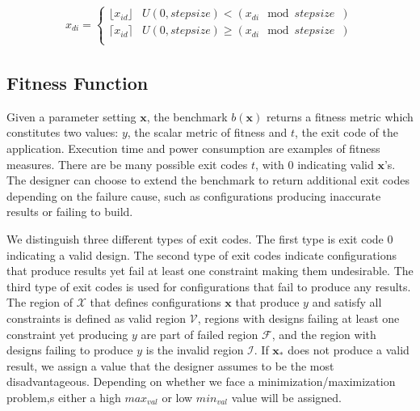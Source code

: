 \documentclass[runningheads,a4paper]{llncs}
\begin{document}


\begin{align} 
\label{eq:dithering}
x_{di} = 
\begin{cases}
\lfloor x_{id} \rfloor &  U(0,step size) < (x_{di}\mod{stepsize}\enspace)\\
\lceil x_{id} \rceil & U(0,step size) \ge (x_{di}\mod{stepsize}\enspace)\\
\end{cases}
\end{align}


 \subsection{Fitness Function}
\label{fitfunction}


Given a parameter setting $\mathbf{x}$, the benchmark $b(\mathbf{x})$ returns a fitness metric which constitutes two values: $y$, the scalar metric of fitness and $t$, the exit code of the application. Execution time and power consumption are examples of fitness measures. There are be many possible exit codes $t$, with 0 indicating valid $\mathbf{x}$'s. The designer can choose to extend the benchmark to return additional exit codes depending on the failure cause, such as configurations producing inaccurate results or failing to build. 

We distinguish three different types of exit codes. The first type is exit code 0 indicating a valid design. The second type of exit codes indicate configurations that produce results yet fail at least one constraint making them undesirable. The third type of exit codes is used for configurations that fail to produce any results. The region of $\mathcal{X}$ that defines configurations $\mathbf{x}$ that produce $y$ and satisfy all constraints is defined as valid region $\mathcal{V}$, regions with designs failing at least one constraint yet producing $y$ are part of failed region $\mathcal{F}$, and the region with designs failing to produce $y$ is the invalid region $\mathcal{I}$. If $\mathbf{x_*}$ does not produce a valid result, we assign a value that the designer assumes to be the most disadvantageous. Depending on whether we face a minimization/maximization problem,s either a high $max_{val}$ or low $min_{val}$ value will be assigned.
\end{document}
